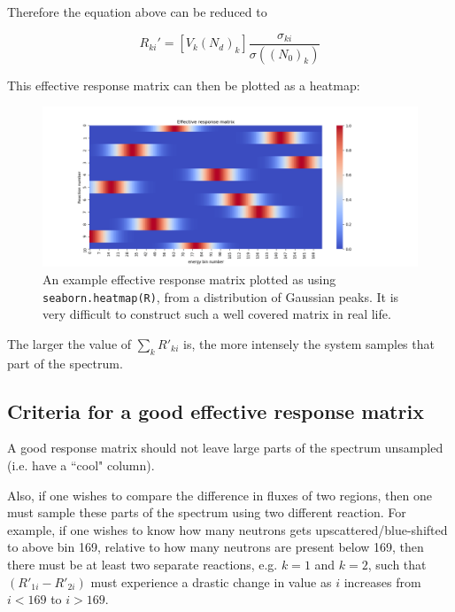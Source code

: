 \documentclass[a4paper, 12pt]{article}
\begin{document}
Therefore the equation above can be reduced to  

\begin{equation}
R_{ki}' = [V_k (N_d)_k] \frac{\sigma_{ki}}{\sigma((N_0)_k)} \label{reduced effective matrix}
\end{equation}

This effective response matrix can then be plotted as a heatmap:

\begin{figure}[H]
\centering
\includegraphics[width=1\textwidth]{EffectiveResponseMatrix.png} %
\caption{An example effective response matrix plotted as using \texttt{seaborn.heatmap(R)}, from a distribution of Gaussian peaks. It is very difficult to construct such a well covered matrix in real life.} \label{Example effective response matrix}
\end{figure}

The larger the value of $\sum\limits_k R'_{ki}$ is, the more intensely the system samples that part of the spectrum.

\subsection{Criteria for a good effective response matrix}\label{criteria}
A good response matrix should not leave large parts of the spectrum unsampled (i.e. have a ``cool" column).

Also, if one wishes to compare the difference in fluxes of two regions, then one must sample these parts of the spectrum using two different reaction. For example, if one wishes to know how many neutrons gets upscattered/blue-shifted to above bin 169, relative to how many neutrons are present below 169, then there must be at least two separate reactions, e.g. $k=1$ and $k=2$, such that $(R'_{1i}-R'_{2i})$ must experience a drastic change in value as $i$ increases from $i<169$ to $i>169$.
\end{document}
